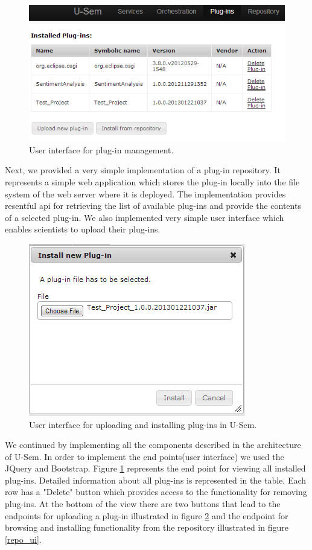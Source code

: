 \begin{figure}[h!]
  \centering
  	\includegraphics[scale=0.70]{plug-in/ui/list.png}
  \caption{User interface for plug-in management.}
  \label{list_ui}
\end{figure}

Next, we provided a very simple implementation of a plug-in repository. It represents a simple web application which stores the plug-in locally into the file system of the web server where it is deployed. The implementation provides resentful api for retrieving the list of available plug-ins and provide the contents of a selected plug-in. We also implemented very simple user interface which enables scientists to upload their plug-ins. 


\begin{figure}[h!]
  \centering
  	\includegraphics[scale=0.6]{plug-in/ui/upload.png}
  \caption{User interface for uploading and installing plug-ins in U-Sem.}
  \label{upload_ui}
\end{figure}

We continued by implementing all the components described in the architecture of U-Sem. In order to implement the end points(user interface) we used the JQuery and Bootstrap. Figure \ref{list_ui} represents the end point for viewing all installed plug-ins. Detailed information about all plug-ins is represented in the table. Each row has a "Delete" button which provides access to the functionality for removing plug-ins. At the bottom of the view there are two buttons that lead to the endpoints for uploading a plug-in illustrated in figure \ref{upload_ui} and the endpoint for browsing and installing functionality from the repository illustrated in figure \ref{repo_ui}.

